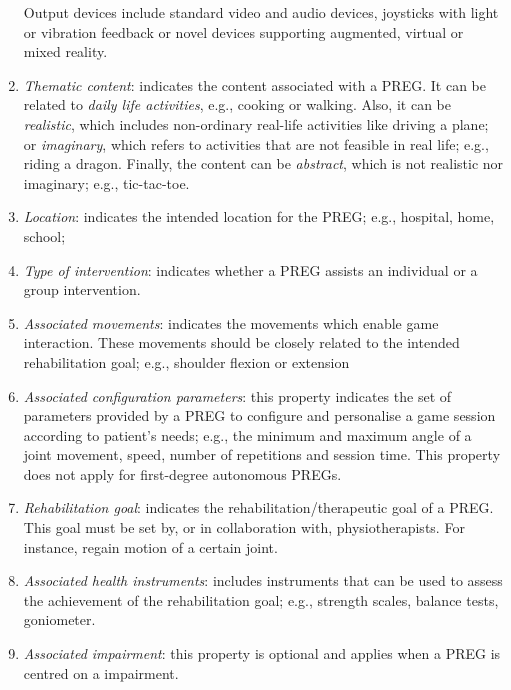 \begin{enumerate}
    Output devices include standard video and audio devices, joysticks with light or vibration feedback or novel devices supporting augmented, virtual or mixed reality.
    
    \item \emph{Thematic content}: indicates the content associated with a \ac{PREG}. It can be related to \textit{daily life activities}, e.g., cooking or walking. Also, it can be \textit{realistic}, which includes non-ordinary real-life activities like driving a plane; or \textit{imaginary}, which refers to activities that are not feasible in real life; e.g., riding a dragon. Finally, the content can be \textit{abstract}, which is not realistic nor imaginary; e.g., tic-tac-toe.
    
    \item \emph{Location}: indicates the intended location for the \ac{PREG}; e.g., hospital, home, school; 
    
    \item \emph{Type of intervention}: indicates whether a \ac{PREG} assists an individual or a group intervention.
    
    \item \emph{Associated movements}: indicates the movements which enable game interaction. These movements should be closely related to the intended rehabilitation goal; e.g., shoulder flexion or extension
    
    \item \emph{Associated configuration parameters}: this property indicates the set of parameters provided by a \ac{PREG} to configure and personalise a game session according to patient’s needs; e.g., the minimum and maximum angle of a joint movement, speed, number of repetitions and session time. This property does not apply for first-degree autonomous \acp{PREG}.
    
    \item \emph{Rehabilitation goal}: indicates the rehabilitation/therapeutic goal of a \ac{PREG}. This goal must be set by, or in collaboration with, physiotherapists. For instance, regain motion of a certain joint.
    
    \item \emph{Associated health instruments}: includes instruments that can be used to assess the achievement of the rehabilitation goal; e.g., strength scales, balance tests, goniometer.
    
    \item \emph{Associated impairment}: this property is optional and applies when a \ac{PREG} is centred on a impairment.
\end{enumerate}

